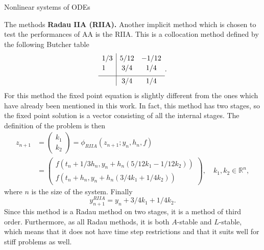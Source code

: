 \documentclass{article}
\begin{document}
\begin{section}{Nonlinear systems of ODEs}
\begin{subsection}{The methods}
\textbf{Radau IIA (RIIA).} Another implicit method which is chosen to test the performances of AA is the RIIA. This is a collocation method defined by the following Butcher table
\begin{equation*}
\begin{array}{l | c c}
      \rule{0pt}{2,3ex} 1/3     &     5/12      &     -1/12    \\
      \rule{0pt}{2,3ex} 1       &     3/4       &      1/4     \\ [1,0ex] \hline
      \rule{0pt}{2,3ex}         &     3/4 	&      1/4
\end{array}.
\end{equation*}
For this method the fixed point equation is slightly different from the ones which have already been mentioned in this work. In fact, this method has two stages, so the fixed point solution is a vector consisting of all the internal stages. The definition of the problem is then
\begin{equation}\label{eq:radaufp}
\begin{split}
	z_{n+1} &= \begin{pmatrix} k_1 \\ k_2 \end{pmatrix} = \phi_{RIIA}(z_{n+1}; y_n, h_n, f) \\
		&= \begin{pmatrix} f(t_n + 1/3h_n,y_n + h_n(5/12k_1 - 1/12k_2)) \\ f(t_n+h_n,y_n + h_n(3/4k_1 + 1/4k_2)) \end{pmatrix}, \quad k_1,k_2 \in \mathbb{R}^n,          
\end{split}
\end{equation}
where $n$ is the size of the system. Finally
\begin{equation*}
	y_{n+1}^{RIIA} = y_{n} + 3/4k_1 + 1/4k_2.
\end{equation*}
Since this method is a Radau method on two stages, it is a method of third order. Furthermore, as all Radau methods, it is both $A$-stable and $L$-stable, which means that it does not have time step restrictions and that it suits well for stiff problems as well. \\


\end{subsection}
\end{section}
\end{document}
